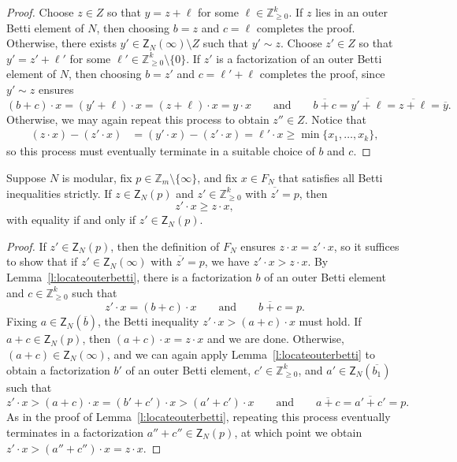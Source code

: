 \documentclass[ALCO, Unicode]{cedram}
\newcommand\ZZ{\mathbb{Z}}
\begin{document}
\begin{proof}
Choose $z \in Z$ so that $y = z + \ell$ for some $\ell \in \ZZ_{\geq 0}^k$.  If $z$ lies in an outer Betti element of $N$, then choosing $b = z$ and $c = \ell$ completes the proof.  Otherwise, there exists $y' \in \mathsf Z_N(\infty) \setminus Z$ such that $y' \sim z$.  Choose $z' \in Z$ so that $y' = z' + \ell'$ for some $\ell' \in \ZZ_{\geq 0}^k \setminus \{0\}$.  If $z'$ is a factorization of an outer Betti element of $N$, then choosing $b = z'$ and $c = \ell' + \ell$ completes the proof, since $y' \sim z$ ensures
$$
(b + c) \cdot x = (y' + \ell) \cdot x = (z + \ell) \cdot x = y \cdot x
\qquad \text{and} \qquad
\overline{b + c} = \overline{y' + \ell} = \overline{z + \ell} = \overline{y}.
$$
Otherwise, we may again repeat this process to obtain $z'' \in Z$.  Notice that 
\begin{align*}
(z \cdot x) - (z' \cdot x)
&= (y' \cdot x) - (z' \cdot x)
= \ell' \cdot x
\ge \min \{x_1, \ldots, x_k\},
\end{align*}
so this process must eventually terminate in a suitable choice of $b$ and $c$.  
\end{proof}

\begin{prop}\label{p:innerfactsminimal}
Suppose $N$ is modular, fix $p \in \ZZ_m \setminus \{\infty\}$, and fix $x \in F_N$ that satisfies all Betti inequalities strictly.  If $z \in \mathsf Z_N(p)$ and $z' \in \ZZ_{\ge 0}^k$ with $\overline{z'} = p$, then
\[
z'\cdot x \geq z \cdot x,
\]
with equality if and only if $z' \in \mathsf{Z}_{N}(p)$.  
\end{prop}

\begin{proof}
If $z' \in \mathsf{Z}_N(p)$, then the definition of $F_N$ ensures $z \cdot x = z'\cdot x$, so it suffices to show that if $z' \in \mathsf{Z}_N(\infty)$ with $\overline{z'} = p$, we have $z' \cdot x > z \cdot x$.  By Lemma~\ref{l:locateouterbetti}, there is a factorization $b$ of an outer Betti element and $c \in \ZZ_{\geq 0}^k$ such that 
\[
z' \cdot x = (b + c) \cdot x
\qquad \text{and} \qquad
\overline{b+c} = p.
\]
Fixing $a \in \mathsf{Z}_N(\overline{b})$, the Betti inequality $z' \cdot x > (a+c) \cdot x$ must hold.  If $a + c \in \mathsf{Z}_N(p)$, then $(a + c) \cdot x = z \cdot x$ and we are done.  Otherwise, $(a+c) \in \mathsf{Z}_N(\infty)$, and we can again apply Lemma~\ref{l:locateouterbetti} to obtain a factorization $b'$ of an outer Betti element, $c' \in \ZZ_{\ge 0}^k$, and $a' \in \mathsf{Z}_N(\overline{b_1})$ such that 
\[
z' \cdot x > (a+c) \cdot x = (b' + c') \cdot x > (a' + c')\cdot x
\qquad \text{and} \qquad
\overline{a+c} = \overline{a' + c'} = p.
\]
As in the proof of Lemma~\ref{l:locateouterbetti}, repeating this process eventually terminates in a factorization $a'' + c'' \in \mathsf Z_N(p)$, at which point we obtain $z' \cdot x > (a'' + c'') \cdot x = z \cdot x$.  
\end{proof}
\end{document}
